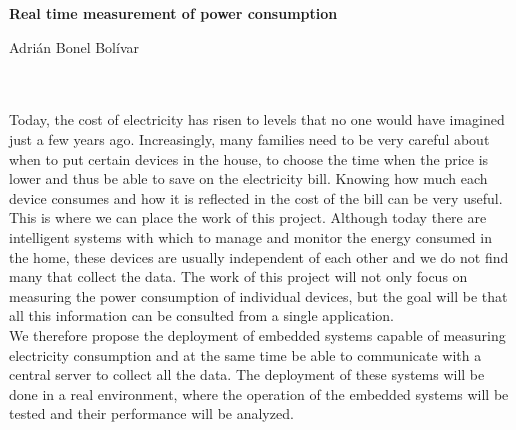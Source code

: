 \cleardoublepage


\thispagestyle{empty}


\begin{center}
{\large\bfseries Real time measurement of power consumption}\\
\end{center}
\begin{center}
Adrián Bonel Bolívar\\
\end{center}

\\

\vspace{0.7cm}
\\

Today, the cost of electricity has risen to levels that no one would have imagined just a few years ago. Increasingly, many families need to be very careful about when to put certain devices in the house, to choose the time when the price is lower and thus be able to save on the electricity bill. Knowing how much each device consumes and how it is reflected in the cost of the bill can be very useful. \\

This is where we can place the work of this project. Although today there are intelligent systems with which to manage and monitor the energy consumed in the home, these devices are usually independent of each other and we do not find many that collect the data. The work of this project will not only focus on measuring the power consumption of individual devices, but the goal will be that all this information can be consulted from a single application. \\

We therefore propose the deployment of embedded systems capable of measuring electricity consumption and at the same time be able to communicate with a central server to collect all the data. The deployment of these systems will be done in a real environment, where the operation of the embedded systems will be tested and their performance will be analyzed. \\

\chapter*{}
\thispagestyle{empty}

